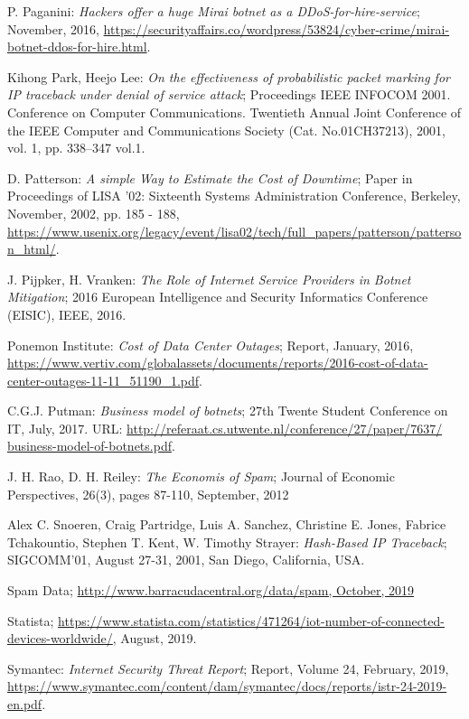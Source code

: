 \begin{thebibliography}{99}
 P. Paganini: \emph{Hackers offer a huge Mirai botnet as a DDoS-for-hire-service}; November, 2016, \url{https://securityaffairs.co/wordpress/53824/cyber-crime/mirai-botnet-ddos-for-hire.html}.

 Kihong Park, Heejo Lee: \emph{On the effectiveness of probabilistic packet marking for IP traceback under denial of service attack}; Proceedings IEEE INFOCOM 2001. Conference on Computer Communications. Twentieth Annual Joint Conference of the IEEE Computer and Communications Society (Cat. No.01CH37213), 2001, vol. 1, pp. 338--347 vol.1.

 D. Patterson: \emph{A simple Way to Estimate the Cost of Downtime}; Paper in Proceedings of LISA '02: Sixteenth Systems Administration Conference, Berkeley, November, 2002, pp. 185 - 188, \url{https://www.usenix.org/legacy/event/lisa02/tech/full_papers/patterson/patterson_html/}.

 J. Pijpker, H. Vranken: \emph{The Role of Internet Service Providers in Botnet Mitigation}; 2016 European Intelligence and Security Informatics Conference (EISIC), IEEE, 2016.

 Ponemon Institute: \emph{Cost of Data Center Outages}; Report, January, 2016, \url{https://www.vertiv.com/globalassets/documents/reports/2016-cost-of-data-center-outages-11-11_51190_1.pdf}.

 C.G.J. Putman: \emph{Business model of botnets}; 27th Twente Student Conference on IT, July, 2017. URL: \url{http://referaat.cs.utwente.nl/conference/27/paper/7637/ business-model-of-botnets.pdf}.

 J. H. Rao, D. H. Reiley: \emph{The Economis of Spam}; Journal of Economic Perspectives, 26(3), pages 87-110, September, 2012

 Alex C. Snoeren, Craig Partridge, Luis A. Sanchez, Christine E. Jones, Fabrice Tchakountio, Stephen T. Kent, W. Timothy Strayer: \emph{Hash-Based IP Traceback}; SIGCOMM'01, August 27-31, 2001, San Diego, California, USA.

 Spam Data; \url{http://www.barracudacentral.org/data/spam, October, 2019} %

 Statista; \url{https://www.statista.com/statistics/471264/iot-number-of-connected-devices-worldwide/}, August, 2019.

 Symantec: \emph{Internet Security Threat Report}; Report, Volume 24, February, 2019, \url{https://www.symantec.com/content/dam/symantec/docs/reports/istr-24-2019-en.pdf}.


\end{thebibliography}
